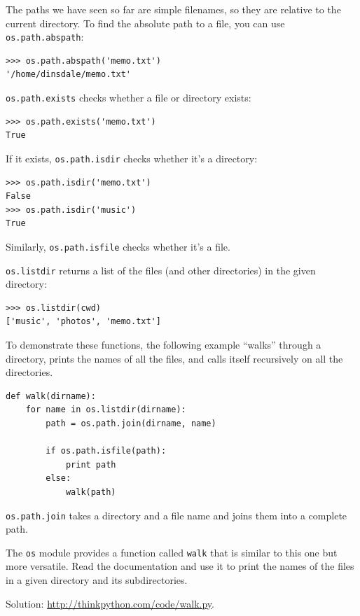 \documentclass[10pt]{book}
\begin{document}
The paths we have seen so far are simple filenames, so they are
relative to the current directory.  To find the absolute path to
a file, you can use {\tt os.path.abspath}:

\begin{verbatim}
>>> os.path.abspath('memo.txt')
'/home/dinsdale/memo.txt'
\end{verbatim}
%
{\tt os.path.exists} checks
whether a file or directory exists:

\begin{verbatim}
>>> os.path.exists('memo.txt')
True
\end{verbatim}
%
If it exists, {\tt os.path.isdir} checks whether it's a directory:

\begin{verbatim}
>>> os.path.isdir('memo.txt')
False
>>> os.path.isdir('music')
True
\end{verbatim}
%
Similarly, {\tt os.path.isfile} checks whether it's a file.

{\tt os.listdir} returns a list of the files (and other directories)
in the given directory:

\begin{verbatim}
>>> os.listdir(cwd)
['music', 'photos', 'memo.txt']
\end{verbatim}
%
To demonstrate these functions, the following example
``walks'' through a directory, prints
the names of all the files, and calls itself recursively on
all the directories.

\begin{verbatim}
def walk(dirname):
    for name in os.listdir(dirname):
        path = os.path.join(dirname, name)

        if os.path.isfile(path):
            print path
        else:
            walk(path)
\end{verbatim}
%
{\tt os.path.join} takes a directory and a file name and joins
them into a complete path.

\begin{exercise}

The {\tt os} module provides a function called {\tt walk}
that is similar to this one but more versatile.  Read
the documentation and use it to print the names of the
files in a given directory and its subdirectories.

Solution: \url{http://thinkpython.com/code/walk.py}.

\end{exercise}
\end{document}
